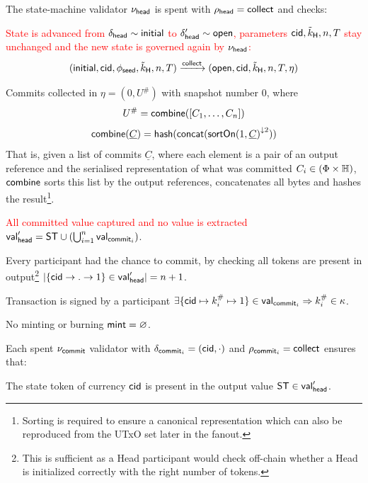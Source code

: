 \noindent The state-machine validator $\nu_\mathsf{head}$ is spent with
$\rho_{\mathsf{head}} = \mathsf{collect}$ and checks:
\begin{menumerate}
	\item \textcolor{red}{State is advanced from $\delta_{\mathsf{head}} \sim \mathsf{initial}$ to $\delta_{\mathsf{head}}' \sim \mathsf{open}$, parameters $\mathsf{cid},\tilde{k}_{\mathsf{H}},n,T$ stay unchanged and the new state is governed again by $\nu_\mathsf{head}$:}
	\[
		(\mathsf{initial},\mathsf{cid},\phi_{\mathsf{seed}},\tilde{k}_{\mathsf{H}},n,T) \xrightarrow{\mathsf{collect}} (\mathsf{open},\mathsf{cid},\tilde{k}_{\mathsf{H}},n,T,\eta)
	\]
	\item Commits collected in $\eta = (0, U^{\#})$ with snapshot number $0$,
	where
	\[
		U^{\#} = \mathsf{combine}([C_{1}, \dots, C_{n}])
	\]
	\[
		\mathsf{combine}(\underline{C}) = \mathsf{hash}(\mathsf{concat}({\mathsf{sortOn}(1, \underline{C})}^{\downarrow2}))
	\]
	That is, given a list of commits $\underline{C}$, where each element is a
	pair of an output reference and the serialised representation of what was
	committed $C_{i} \in (\Phi \times \mathbb{H})$, $\mathsf{combine}$ sorts this
	list by the output references, concatenates all bytes and hashes the
	result\footnote{Sorting is required to ensure a canonical representation
		which can also be reproduced from the UTxO set later in the fanout.}.

	\item \textcolor{red}{All committed value captured and no value is extracted}
	$\mathsf{val}_{\mathsf{head}}' = \mathsf{ST} \cup (\bigcup_{i=1}^{n} \mathsf{val}_{\mathsf{commit}_{i}})$.
	\item Every participant had the chance to commit, by checking all tokens are
	present in output\footnote{This is sufficient as a Head participant would
		check off-chain whether a Head is initialized correctly with the right
		number of tokens.}
	$|\{\mathsf{cid} \rightarrow . \rightarrow 1\} \in \mathsf{val}_{\mathsf{head}}'| = n + 1$.
	\item Transaction is signed by a participant $\exists \{\mathsf{cid} \mapsto k^{\#}_{i} \mapsto 1\} \in \mathsf{val}_{\mathsf{commit}_{i}} \Rightarrow k^{\#}_{i} \in \kappa$.
	\item No minting or burning  $\mathsf{mint} = \varnothing$.
\end{menumerate}

\noindent Each spent $\nu_{\mathsf{commit}}$ validator with $\delta_{\mathsf{commit}_{i}} = (\mathsf{cid},\cdot)$ and $\rho_{\mathsf{commit}_{i}} = \mathsf{collect}$ ensures that:
\begin{menumerate}
	\item The state token of currency $\mathsf{cid}$ is present in the output value
	$\mathsf{ST} \in \mathsf{val}_{\mathsf{head}}'$.
\end{menumerate}

